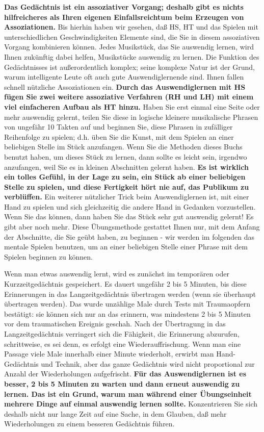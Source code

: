 \textbf{Das Gedächtnis ist ein assoziativer Vorgang; deshalb gibt es nichts hilfreicheres als Ihren eigenen Einfallsreichtum beim Erzeugen von Assoziationen.}
Bis hierhin haben wir gesehen, daß HS, HT und das Spielen mit unterschiedlichen Geschwindigkeiten Elemente sind, die Sie in diesem assoziativen Vorgang kombinieren können.
Jedes Musikstück, das Sie auswendig lernen, wird Ihnen zukünftig dabei helfen, Musikstücke auswendig zu lernen.
Die Funktion des Gedächtnisses ist außerordentlich komplex; seine komplexe Natur ist der Grund, warum intelligente Leute oft auch gute Auswendiglernende sind.
Ihnen fallen schnell nützliche Assoziationen ein.
\textbf{Durch das Auswendiglernen mit HS fügen Sie zwei weitere assoziative Verfahren (RH und LH) mit einem viel einfacheren Aufbau als HT hinzu.}
Haben Sie erst einmal eine Seite oder mehr auswendig gelernt, teilen Sie diese in logische kleinere musikalische Phrasen von ungefähr 10 Takten auf und beginnen Sie, diese Phrasen in zufälliger Reihenfolge zu spielen; d.h. üben Sie die Kunst, mit dem Spielen an einer beliebigen Stelle im Stück anzufangen.
Wenn Sie die Methoden dieses Buchs benutzt haben, um dieses Stück zu lernen, dann sollte es leicht sein, irgendwo anzufangen, weil Sie es in kleinen Abschnitten gelernt haben.
\textbf{Es ist wirklich ein tolles Gefühl, in der Lage zu sein, ein Stück ab einer beliebigen Stelle zu spielen, und diese Fertigkeit hört nie auf, das Publikum zu verblüffen.}
Ein weiterer nützlicher Trick beim Auswendiglernen ist, mit einer Hand zu spielen und sich gleichzeitig die andere Hand in Gedanken vorzustellen.
Wenn Sie das können, dann haben Sie das Stück sehr gut auswendig gelernt!
Es gibt aber noch mehr.
Diese Übungsmethode gestattet Ihnen nur, mit dem Anfang der Abschnitte, die Sie geübt haben, zu beginnen - wir werden im folgenden das mentale Spielen benutzen, um an einer beliebigen Stelle einer Phrase mit dem Spielen beginnen zu können.

Wenn man etwas auswendig lernt, wird es zunächst im temporären oder Kurzzeitgedächtnis gespeichert.
Es dauert ungefähr 2 bis 5 Minuten, bis diese Erinnerungen in das Langzeitgedächtnis übertragen werden (wenn sie überhaupt übertragen werden).
Das wurde unzählige Male durch Tests mit Traumaopfern bestätigt: sie können sich nur an das erinnern, was mindestens 2 bis 5 Minuten vor dem traumatischen Ereignis geschah.
Nach der Übertragung in das Langzeitgedächtnis verringert sich die Fähigkeit, die Erinnerung abzurufen, schrittweise, es sei denn, es erfolgt eine Wiederauffrischung.
Wenn man eine Passage viele Male innerhalb einer Minute wiederholt, erwirbt man Hand-Gedächtnis und Technik, aber das ganze Gedächtnis wird nicht proportional zur Anzahl der Wiederholungen aufgefrischt.
\textbf{Für das Auswendiglernen ist es besser, 2 bis 5 Minuten zu warten und dann erneut auswendig zu lernen.
Das ist ein Grund, warum man während einer Übungseinheit mehrere Dinge auf einmal auswendig lernen sollte.}
Konzentrieren Sie sich deshalb nicht nur lange Zeit auf eine Sache, in dem Glauben, daß mehr Wiederholungen zu einem besseren Gedächtnis führen.
 
